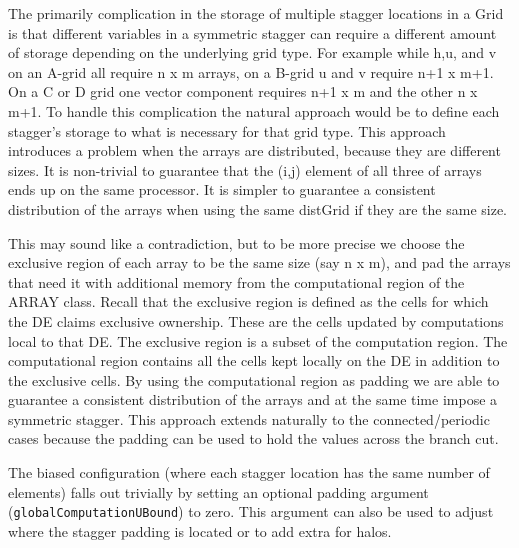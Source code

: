 The primarily complication in the storage of multiple stagger locations in a Grid is that different variables in a symmetric stagger can require a different amount of storage depending on the underlying grid type.  For example while h,u, and v on an A-grid all require n x m arrays, on a B-grid u and v require n+1 x m+1. On a C or D grid one vector component requires n+1 x m and the other n x m+1. To handle this complication the natural approach would be to define each stagger's storage to what is necessary for that grid type. This approach introduces a problem when the arrays are distributed, because they are different sizes. It is non-trivial to guarantee that the (i,j) element of all three of arrays ends up on the same processor. It is simpler to guarantee a consistent distribution of the arrays when using the same distGrid if they are the same size.

This may sound like a contradiction, but to be more precise we choose the exclusive region of each array to be the same size (say n x m), and pad the arrays that need it with additional memory from the computational region of the ARRAY class. Recall that the exclusive region is defined as the cells for which the DE claims exclusive ownership. These are the cells updated by computations local to that DE. The exclusive region is a subset of the computation region. The computational region contains all the cells kept locally on the DE in addition to the exclusive cells. By using the computational region as padding we are able to guarantee a consistent distribution of the arrays and at the same time impose a symmetric stagger. This approach extends naturally to the connected/periodic cases because the padding can be used to hold the values across the branch cut.

The biased configuration (where each stagger location has the same number of elements) falls out trivially by setting an optional padding argument ({\tt globalComputationUBound}) to zero. This argument can also be used to adjust where the stagger padding is located or
to add extra for halos. 



